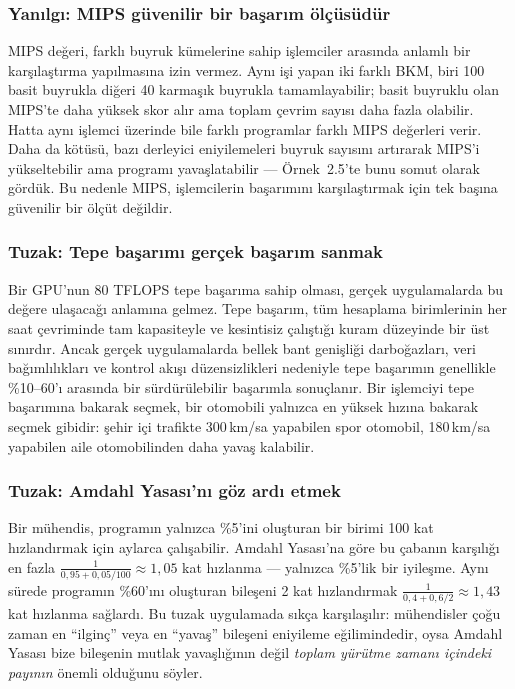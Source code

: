 \subsubsection*{Yanılgı: MIPS güvenilir bir başarım ölçüsüdür}
MIPS değeri, farklı buyruk kümelerine sahip işlemciler arasında anlamlı bir karşılaştırma yapılmasına izin vermez. Aynı işi yapan iki farklı BKM, biri 100 basit buyrukla diğeri 40 karmaşık buyrukla tamamlayabilir; basit buyruklu olan MIPS'te daha yüksek skor alır ama toplam çevrim sayısı daha fazla olabilir. Hatta aynı işlemci üzerinde bile farklı programlar farklı MIPS değerleri verir. Daha da kötüsü, bazı derleyici eniyilemeleri buyruk sayısını artırarak MIPS'i yükseltebilir ama programı yavaşlatabilir --- Örnek~2.5'te bunu somut olarak gördük. Bu nedenle MIPS, işlemcilerin başarımını karşılaştırmak için tek başına güvenilir bir ölçüt değildir.

\subsubsection*{Tuzak: Tepe başarımı gerçek başarım sanmak}
Bir GPU'nun 80 TFLOPS tepe başarıma sahip olması, gerçek uygulamalarda bu değere ulaşacağı anlamına gelmez. Tepe başarım, tüm hesaplama birimlerinin her saat çevriminde tam kapasiteyle ve kesintisiz çalıştığı kuram düzeyinde bir üst sınırdır. Ancak gerçek uygulamalarda bellek bant genişliği darboğazları, veri bağımlılıkları ve kontrol akışı düzensizlikleri nedeniyle tepe başarımın genellikle \%10--60'ı arasında bir sürdürülebilir başarımla sonuçlanır. Bir işlemciyi tepe başarımına bakarak seçmek, bir otomobili yalnızca en yüksek hızına bakarak seçmek gibidir: şehir içi trafikte 300\,km/sa yapabilen spor otomobil, 180\,km/sa yapabilen aile otomobilinden daha yavaş kalabilir.

\subsubsection*{Tuzak: Amdahl Yasası'nı göz ardı etmek}
Bir mühendis, programın yalnızca \%5'ini oluşturan bir birimi 100 kat hızlandırmak için aylarca çalışabilir. Amdahl Yasası'na göre bu çabanın karşılığı en fazla $\frac{1}{0{,}95 + 0{,}05/100} \approx 1{,}05$ kat hızlanma --- yalnızca \%5'lik bir iyileşme. Aynı sürede programın \%60'ını oluşturan bileşeni 2 kat hızlandırmak $\frac{1}{0{,}4 + 0{,}6/2} \approx 1{,}43$ kat hızlanma sağlardı. Bu tuzak uygulamada sıkça karşılaşılır: mühendisler çoğu zaman en ``ilginç'' veya en ``yavaş'' bileşeni eniyileme eğilimindedir, oysa Amdahl Yasası bize bileşenin mutlak yavaşlığının değil \emph{toplam yürütme zamanı içindeki payının} önemli olduğunu söyler.

